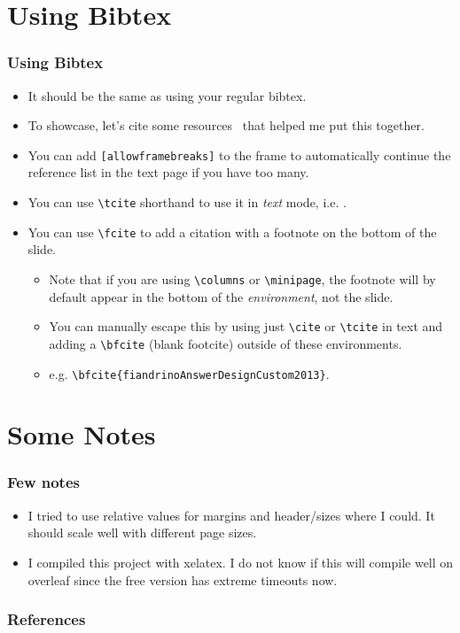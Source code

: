 \documentclass[
	10pt, %
	aspectratio=169, %
]{beamer}
\begin{document}
\section{Using Bibtex}
\begin{frame}
	\frametitle{Using Bibtex}
	\begin{itemize}
		\item It should be the same as using your regular bibtex.
		\item To showcase, let's cite some resources~\cite{anglimAnswerImageFull2010,fiandrinoAnswerDesignCustom2013,kormyloAnswerMakeTikz2017} that helped me put this together.
		\item You can add \texttt{[allowframebreaks]} to the frame to automatically continue the reference list in the text page if you have too many.
		\item You can use \texttt{\textbackslash tcite} shorthand to use it in \textit{text} mode, i.e. .
		\item You can use \texttt{\textbackslash fcite} to add a citation with a footnote on the bottom of the slide.
		      \begin{itemize}
			      \item Note that if you are using \texttt{\textbackslash columns} or \texttt{\textbackslash minipage}, the footnote will by default appear in the bottom of the \textit{environment}, not the slide.
			      \item You can manually escape this by using just \texttt{\textbackslash cite} or \texttt{\textbackslash tcite} in text and adding a \texttt{\textbackslash bfcite} (blank footcite) outside of these environments.
			      \item e.g. \texttt{\textbackslash bfcite\{fiandrinoAnswerDesignCustom2013\}}.
		      \end{itemize}
	\end{itemize}
\end{frame}

\section{Some Notes}
\begin{frame}
	\frametitle{Few notes}
	\begin{itemize}
		\item I tried to use relative values for margins and header/sizes where I could. It should scale well with different page sizes.
		\item I compiled this project with xelatex. I do not know if this will compile well on overleaf since the free version has extreme timeouts now.
	\end{itemize}
\end{frame}

\begin{frame}[allowframebreaks]
	\frametitle{References}
	\printbibliography
\end{frame}
\end{document}
